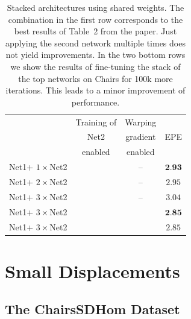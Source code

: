 \documentclass[10pt,twocolumn,letterpaper]{article}%
\newcommand{\my}{\textcolor{dgreen}{\ding{51}}}%
\newcommand{\mn}{\textcolor{dred}{\ding{55}}}%
\newcommand{\chairs}{\mbox{Chairs}\xspace}
\newcommand{\neta}{Net1\xspace}
\newcommand{\netb}{Net2\xspace}
\begin{document}
\begin{table}
  \begin{center}
  \begin{tabular}{|l||c|c|c|}%
  \hline
        & Training of    & Warping  &  \\
        & \netb          & gradient & EPE  \\
        & enabled        & enabled  &  \\
  \hline \hline
  \neta + $1\times$\netb & \mn  & --   & $\textbf{2.93}$      \\ 
  \neta + $2\times$\netb & \mn  & --   & $2.95$ \\
  \neta + $3\times$\netb & \mn  & --   & $3.04$ \\
  \hline 
  \neta + $3\times$\netb & \my & \mn  & $\textbf{2.85}$ \\ 
  \neta + $3\times$\netb & \my & \my  & $2.85$ \\
  \hline
  \end{tabular}
  \end{center}
  \caption{
  Stacked architectures using shared weights. The combination in the first row corresponds to the best results of Table~2 from the paper. Just applying the second network multiple times does not yield improvements. In the two bottom rows we show the results of fine-tuning the stack of the top networks on \chairs for 100k more iterations. This leads to a minor improvement of performance. 
  } \label{tab:shared-weights}
\end{table} 


\section{Small Displacements}

\subsection{The ChairsSDHom Dataset} 

\end{document}
